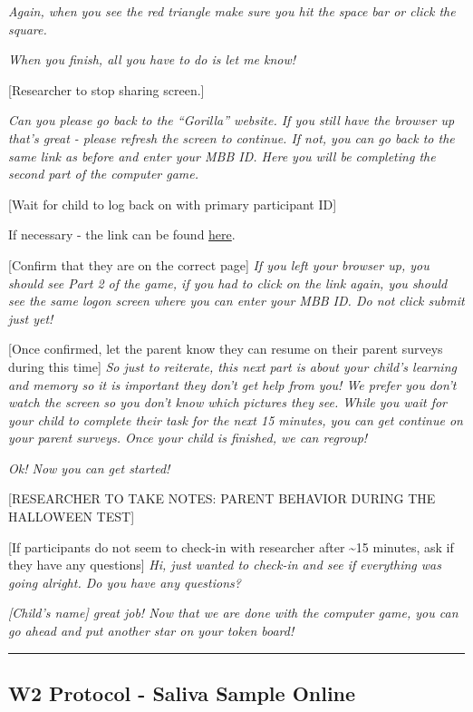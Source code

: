 \documentclass[]{book}
\begin{document}
\emph{Again, when you see the red triangle make sure you hit the space bar or click the square.}

\emph{When you finish, all you have to do is let me know!}

{[}Researcher to stop sharing screen.{]}

\emph{Can you please go back to the ``Gorilla'' website. If you still have the browser up that's great - please refresh the screen to continue. If not, you can go back to the same link as before and enter your MBB ID. Here you will be completing the second part of the computer game.}

{[}Wait for child to log back on with primary participant ID{]}

If necessary - the link can be found \href{https://research.sc/participant/login/39409/publicid}{here}.

{[}Confirm that they are on the correct page{]} \emph{If you left your browser up, you should see Part 2 of the game, if you had to click on the link again, you should see the same logon screen where you can enter your MBB ID. Do not click submit just yet!}

{[}Once confirmed, let the parent know they can resume on their parent surveys during this time{]} \emph{So just to reiterate, this next part is about your child's learning and memory so it is important they don't get help from you! We prefer you don't watch the screen so you don't know which pictures they see. While you wait for your child to complete their task for the next 15 minutes, you can get continue on your parent surveys. Once your child is finished, we can regroup!}

\emph{Ok! Now you can get started!}

{[}RESEARCHER TO TAKE NOTES: PARENT BEHAVIOR DURING THE HALLOWEEN TEST{]}

{[}If participants do not seem to check-in with researcher after \textasciitilde{}15 minutes, ask if they have any questions{]} \emph{Hi, just wanted to check-in and see if everything was going alright. Do you have any questions?}

\emph{{[}Child's name{]} great job! Now that we are done with the computer game, you can go ahead and put another star on your token board!}

\begin{center}\rule{0.5\linewidth}{0.5pt}\end{center}

\hypertarget{w2-protocol---saliva-sample-online}{%
\subsection{W2 Protocol - Saliva Sample Online}\label{w2-protocol---saliva-sample-online}}
\end{document}
